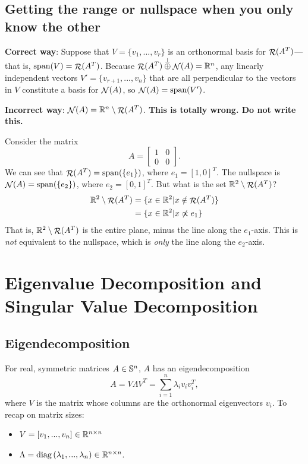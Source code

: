\documentclass[12pt]{article}
\begin{document}
\subsection{Getting the range or nullspace when you only know the other}

\textbf{Correct way}: Suppose that $V = \{v_1, ..., v_r\}$ is an orthonormal basis for $\mathop{\mathcal{R}}\nolimits(A^T)$---that is, $\text{span}(V) = \mathop{\mathcal{R}}\nolimits(A^T)$. Because $\mathop{\mathcal{R}}\nolimits(A^T) \overset{\perp}{\oplus} \mathop{\mathcal{N}}\nolimits(A) = { {\mathbb R}^{n} }$, any linearly independent vectors $V' = \{v_{r+1}, ..., v_n\}$ that are all perpendicular to the vectors in $V$ constitute a basis for $\mathop{\mathcal{N}}\nolimits(A)$, so $\mathop{\mathcal{N}}\nolimits(A) = \text{span}(V')$. 

\textbf{Incorrect way}: $\mathop{\mathcal{N}}\nolimits(A) = { {\mathbb R}^{n} } \setminus \mathop{\mathcal{R}}\nolimits(A^T)$. \textbf{This is totally wrong. Do not write this.}
\vspace{10pt}
\begin{example} Consider the matrix
%
\begin{equation*}
A = \left[ \begin{matrix}
1 & 0 \\
0 & 0
\end{matrix}\right].
\end{equation*}
%
We can see that $\mathop{\mathcal{R}}\nolimits(A^T) = \text{span}(\{e_1\})$, where $e_1 = [1, 0]^T$. The nullspace is $\mathop{\mathcal{N}}\nolimits(A) = \text{span}(\{e_2\})$, where $e_2 = [0, 1]^T$. But what is the set ${ {\mathbb R}^{2} } \setminus \mathop{\mathcal{R}}\nolimits(A^T)$?
%
\begin{align*}
{ {\mathbb R}^{2} } \setminus \mathop{\mathcal{R}}\nolimits(A^T) &= \{x \in { {\mathbb R}^{2} } | x \notin \mathop{\mathcal{R}}\nolimits(A^T)\} \\
&= \{x \in { {\mathbb R}^{2} } | x \not\propto e_1\}
\end{align*}
%
That is, ${ {\mathbb R}^{2} } \setminus \mathop{\mathcal{R}}\nolimits(A^T)$ is the entire plane, minus the line along the $e_1$-axis. This is \textit{not} equivalent to the nullspace, which is \textit{only} the line along the $e_2$-axis. 
\end{example}


\pagebreak
\section{Eigenvalue Decomposition and Singular Value Decomposition}

\subsection{Eigendecomposition}
For real, symmetric matrices $A \in { {\mathbb S}^{n} }$, $A$ has an eigendecomposition
%
\begin{equation*}
A = V\Lambda V^T = \sum_{i=1}^n \lambda_i v_i v_i^T,
\end{equation*}
%
where $V$ is the matrix whose columns are the orthonormal eigenvectors $v_i$. To recap on matrix sizes:
%
\begin{itemize}
\item $V = [v_1, ..., v_n] \in { {\mathbb R}^{n \times n} }$
\item $\Lambda = \mathrm{diag}\left({\lambda_1, ..., \lambda_n}\right) \in { {\mathbb R}^{n \times n} }$. 
\end{itemize}
\end{document}
